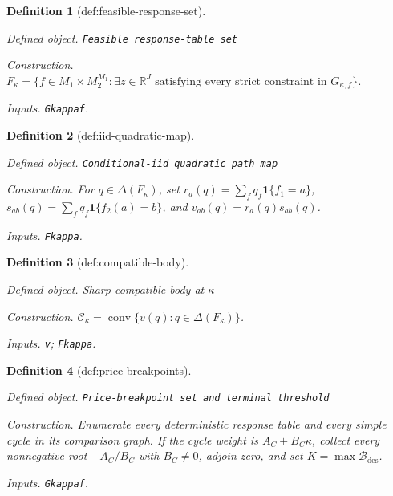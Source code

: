 \documentclass{article}
\newtheorem{definition}{Definition}
\begin{document}
\begin{definition}[def:feasible-response-set]\label{def:feasible-response-set}
\par\smallskip\noindent\emph{Defined object.} \texttt{Feasible response-\allowbreak{}table set}
\par\smallskip\noindent\emph{Construction.} \(F_\kappa=\{f\in M_1\times M_2^{M_1}:\exists z\in\mathbb R^J\text{ satisfying every strict constraint in }G_{\kappa,f}\}\).
\par\smallskip\noindent\emph{Inputs.} \texttt{Gkappaf}.
\end{definition}

\begin{definition}[def:iid-quadratic-map]\label{def:iid-quadratic-map}
\par\smallskip\noindent\emph{Defined object.} \texttt{Conditional-\allowbreak{}iid quadratic path map}
\par\smallskip\noindent\emph{Construction.} For \(q\in\Delta(F_\kappa)\), set \(r_a(q)=\sum_fq_f\mathbf 1\{f_1=a\}\), \(s_{ab}(q)=\sum_fq_f\mathbf 1\{f_2(a)=b\}\), and \(v_{ab}(q)=r_a(q)s_{ab}(q)\).
\par\smallskip\noindent\emph{Inputs.} \texttt{Fkappa}.
\end{definition}

\begin{definition}[def:compatible-body]\label{def:compatible-body}
\par\smallskip\noindent\emph{Defined object.} Sharp compatible body at \(\kappa\)
\par\smallskip\noindent\emph{Construction.} \(\mathcal C_\kappa=\operatorname{conv}\{v(q):q\in\Delta(F_\kappa)\}\).
\par\smallskip\noindent\emph{Inputs.} \texttt{v}; \texttt{Fkappa}.
\end{definition}

\begin{definition}[def:price-breakpoints]\label{def:price-breakpoints}
\par\smallskip\noindent\emph{Defined object.} \texttt{Price-\allowbreak{}breakpoint set and terminal threshold}
\par\smallskip\noindent\emph{Construction.} Enumerate every deterministic response table and every simple cycle in its comparison graph. If the cycle weight is \(A_C+B_C\kappa\), collect every nonnegative root \(-A_C/B_C\) with \(B_C\ne0\), adjoin zero, and set \(K=\max\mathcal B_{\mathrm{des}}\).
\par\smallskip\noindent\emph{Inputs.} \texttt{Gkappaf}.
\end{definition}
\end{document}
